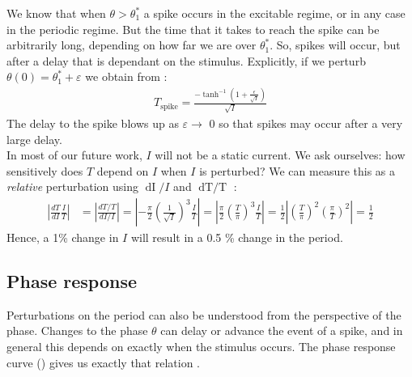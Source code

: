 We know that when $\theta > \theta^{\ast}_{1}$ a spike occurs in the excitable regime, or in any case in the periodic regime. But the time that it takes to reach the spike can be arbitrarily long, depending on how far we are over $\theta^{\ast}_{1}$. So, spikes will occur, but after a delay that is dependant on the stimulus. Explicitly, if we perturb $\theta(0) = \theta^{\ast}_{1} + \varepsilon$ we obtain from \cite{Gutkin2014}:
\begin{align*}
T_{\text {spike}} = \frac{-\tanh ^{-1}\left(1+\frac{\epsilon}{\sqrt{I}}\right)}{\sqrt{I}}
\end{align*}
The delay to the spike blows up as $\varepsilon \rightarrow$ 0 so that spikes may occur after a very large delay. \\

In most of our future work, $I$ will not be a static current. We ask ourselves: how sensitively does $T$ depend on $I$ when $I$ is perturbed? We can measure this as a \textsl{relative} perturbation using $\mathop{dI}/I$ and $\mathop{dT/T}$ \cite{IntroductionModelingDynamics} :
\begin{align*}
\left| \frac{dT}{dI} \frac{I}{T} \right| &= \left| \frac{dT / T}{dI / I}\right| 
= \left|- \frac{\pi}{2} \left(\frac{1}{\sqrt{I}}\right)^3 \frac{I}{T} \right| 
= \left| \frac{\pi}{2} \left(\frac{T}{\pi}\right)^3 \frac{I}{T} \right| 
= \frac{1}{2} \left|\left(\frac{T}{\pi}\right)^2 \left(\frac{\pi}{T}\right)^2 \right| = \frac{1}{2}
\end{align*}
Hence, a 1\% change in $I$ will result in a 0.5 \% change in the period.


\subsection{Phase response} \label{sec:TheThetaNeuronModelPhaseResponse}
Perturbations on the period can also be understood from the perspective of the phase. Changes to the phase $\theta$ can delay or advance the event of a spike, and in general this depends on exactly when the stimulus occurs. The phase response curve (\PRC) gives us exactly that relation \cite{Perez2020, Gutkin2014}.

